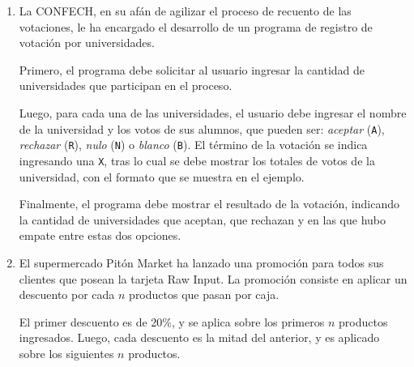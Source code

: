 \documentclass[11pt,spanish]{article}
\newcommand{\pond}[1]{[{\small\textbf{#1\%}}]}
\begin{document}
\begin{enumerate}[font=\Large\bfseries]
    \newpage
    \item
      \pond{25}
      La CONFECH,
      en su afán de agilizar el proceso de recuento de las votaciones,
      le ha encargado el desarrollo de un programa de registro de votación por universidades.

      \begin{minipage}[t]{.5\textwidth}
        Primero, el programa debe solicitar al usuario ingresar
        la cantidad de universidades que participan en el proceso.
        \vspace{1ex}

        Luego, para cada una de las universidades,
        el usuario debe ingresar
        el nombre de la universidad
        y los votos de sus alumnos, que pueden ser:
        \emph{aceptar} (\texttt{A}),
        \emph{rechazar} (\texttt{R}),
        \emph{nulo} (\texttt{N}) o
        \emph{blanco} (\texttt{B}).
        El término de la votación se indica ingresando una \texttt{X},
        tras lo cual se debe mostrar los totales de votos de la universidad,
        con el formato que se muestra en el ejemplo.
        \vspace{1ex}

        Finalmente,
        el programa debe mostrar el resultado de la votación,
        indicando la cantidad de universidades que aceptan, que rechazan
        y en las que hubo empate entre estas dos opciones.

      \end{minipage}
      \hfill
      \begin{minipage}[t]{.4\textwidth}
        
      \end{minipage}

    \newpage
    \item
      \pond{25}
      El supermercado Pitón Market ha lanzado una promoción
      para todos sus clientes que posean la tarjeta Raw Input.
      La promoción consiste en aplicar un descuento
      por cada \(n\) productos que pasan por caja.

      \begin{minipage}[t]{.55\textwidth}
        El primer descuento es de 20\%,
        y se aplica sobre los primeros \(n\) productos ingresados.
        Luego,
        cada descuento es la mitad del anterior,
        y es aplicado sobre los siguientes \(n\) productos.
        \vspace{1ex}


\end{minipage}
\end{enumerate}
\end{document}
